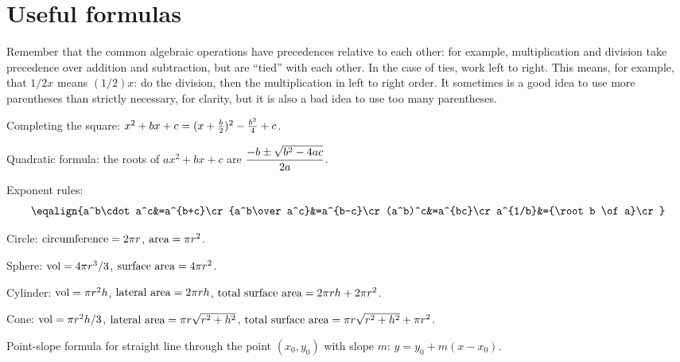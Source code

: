 \htmlonly
\chapter{Useful formulas}
\endhtmlonly
\msk{}

\item{} Remember that the common algebraic operations have {\dfont
  precedences\/} relative to each other: for example,
  multiplication and division take precedence over addition and
  subtraction, but are ``tied'' with each other. In the case of ties,
  work left to right.  This means, for example, that $1/2x$ means
  $(1/2)x$: do the division, then the multiplication in left to right
  order. It sometimes is a good idea to use more parentheses than
  strictly necessary, for clarity, but it is also a bad idea to use
  too many parentheses.

\msk Completing the square:
    $x^2+bx+c=(x+{b\over 2})^2-{b^2\over 4}+c$.

\msk Quadratic formula: the roots of $ax^2+bx+c$ are
$\displaystyle {-b\pm\sqrt{b^2-4ac}\over 2a}$.

\msk Exponent rules:
$$\eqalign{a^b\cdot a^c&=a^{b+c}\cr
{a^b\over a^c}&=a^{b-c}\cr
(a^b)^c&=a^{bc}\cr
a^{1/b}&={\root b \of a}\cr}$$

\msk{}

\msk Circle:
 $\hbox{circumference}=2\pi r$, $\hbox{area}=\pi r^2$.

\msk Sphere:
$\hbox{vol}=4\pi r^3/3$, $\hbox{surface area}=4\pi r^2$.

\msk Cylinder:
 $\hbox{vol} =\pi r^2h$, $\hbox{lateral area}= 2\pi rh$,
$\hbox{total surface area} =2\pi rh+2\pi r^2$. 

\msk\item{} Cone:
  $\hbox{vol}=\pi r^2h/3$, 
$\hbox{lateral area}=\pi r\sqrt{r^2+h^2}$,
$\hbox{total surface area}= \pi r\sqrt{r^2+h^2}+\pi r^2$.

\msk{}
\nobreak
\msk\item{} Point-slope formula 
for straight line through the point
$(x_0,y_0)$ with slope $m$: $y=y_0+m(x-x_0)$.

